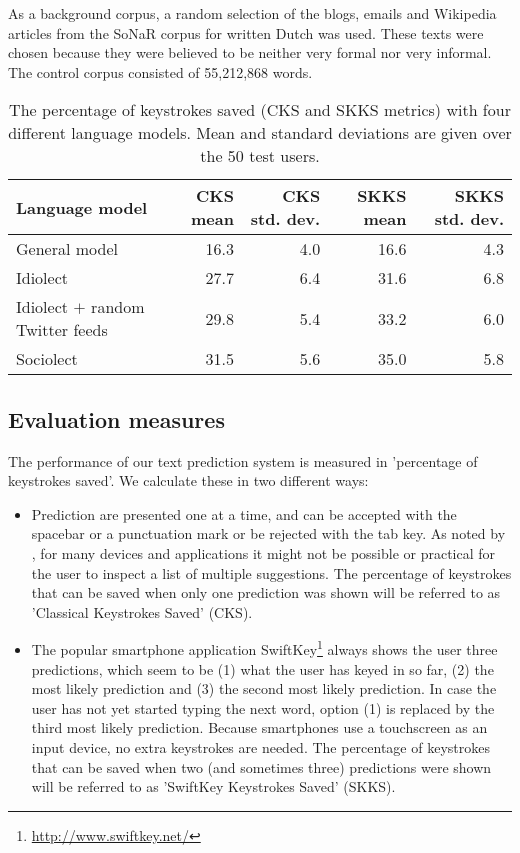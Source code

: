 \documentclass[11pt]{article}
\begin{document}
As a background corpus, a random selection of the blogs, emails and Wikipedia articles from the SoNaR corpus for written Dutch \cite{oostdijk13} was used. These texts were chosen because they were believed to be neither very formal nor very informal. The control corpus consisted of 55,212,868 words.

\begin{table*}[htb]
\begin{center}
\begin{tabular}{l|rr|rr}
Language model&CKS mean&CKS std. dev.&SKKS mean&SKKS std. dev.\\
\hline
General model & 16.3 & 4.0 & 16.6 & 4.3 \\
Idiolect & 27.7 & 6.4 & 31.6 & 6.8 \\
Idiolect $+$ random Twitter feeds & 29.8 & 5.4 & 33.2 & 6.0 \\
Sociolect & 31.5 & 5.6 & 35.0 & 5.8 \\
\end{tabular}
\caption{The percentage of keystrokes saved (CKS and SKKS metrics) with four different language models. Mean and standard deviations are given over the 50 test users.}
\label{results}
\end{center}
\end{table*}


\subsection{Evaluation measures}
The performance of our text prediction system is measured in 'percentage of keystrokes saved'. We calculate these in two different ways:
\begin{itemize}
\item Prediction are presented one at a time, and can be accepted with the spacebar or a punctuation mark or be rejected with the tab key. As noted by , for many devices and applications it might not be possible or practical for the user to inspect a list of multiple suggestions. The percentage of keystrokes that can be saved when only one prediction was shown will be referred to as 'Classical Keystrokes Saved' (CKS).
\item The popular smartphone application SwiftKey\footnote{\url{http://www.swiftkey.net/}} always shows the user three predictions, which seem to be (1) what the user has keyed in so far, (2) the most likely prediction and (3) the second most likely prediction. In case the user has not yet started typing the next word, option (1) is replaced by the third most likely prediction. Because smartphones use a touchscreen as an input device, no extra keystrokes are needed. The percentage of keystrokes that can be saved when two (and sometimes three) predictions were shown will be referred to as 'SwiftKey Keystrokes Saved' (SKKS).
\end{itemize}
\end{document}
